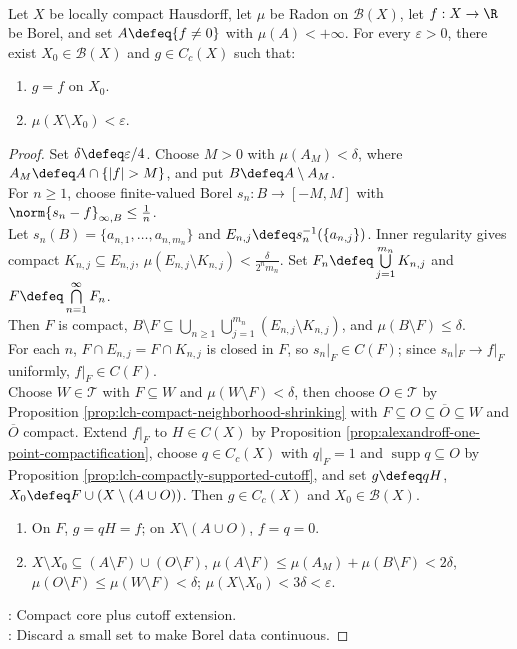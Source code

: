 \begin{theorem} \label{thm:lusin-radon-locally-compact} \\
Let $X$ be locally compact Hausdorff, let $\mu$ be Radon on $\mathcal{B}(X)$, let $f:X\to\R$ be Borel, and set $A\defeq\{f\neq0\}$ with $\mu(A)<+\infty$. For every $\varepsilon>0$, there exist $X_0\in\mathcal{B}(X)$ and $g\in C_c(X)$ such that:
\begin{enumerate}[label=(\roman*)]
\setlength{\itemsep}{0pt}
\item $g=f$ on $X_0$.
\item $\mu(X\setminus X_0)<\varepsilon$.
\end{enumerate}
\begin{proof} Set $\delta\defeq\varepsilon/4$. Choose $M>0$ with $\mu(A_M)<\delta$, where $A_M\defeq A\cap\{|f|>M\}$, and put $B\defeq A\setminus A_M$.\\
For $n\geq1$, choose finite-valued Borel $s_n:B\to[-M,M]$ with $\norm{s_n-f}_{\infty,B}\leq\frac{1}{n}$.\\
Let $s_n(B)=\{a_{n,1},\ldots,a_{n,m_n}\}$ and $E_{n,j}\defeq s_n^{-1}(\{a_{n,j}\})$. Inner regularity gives compact $K_{n,j}\subseteq E_{n,j}$, $\mu(E_{n,j}\setminus K_{n,j})<\frac{\delta}{2^n m_n}$. Set $F_n\defeq\bigcup\limits_{j=1}^{m_n}K_{n,j}$ and $F\defeq\bigcap\limits_{n=1}^{\infty}F_n$.\\
Then $F$ is compact, $B\setminus F\subseteq\bigcup\limits_{n\geq1}\bigcup\limits_{j=1}^{m_n}(E_{n,j}\setminus K_{n,j})$, and $\mu(B\setminus F)\leq\delta$.\\
For each $n$, $F\cap E_{n,j}=F\cap K_{n,j}$ is closed in $F$, so $s_n|_F\in C(F)$; since $s_n|_F\to f|_F$ uniformly, $f|_F\in C(F)$.\\
Choose $W\in\mathcal{T}$ with $F\subseteq W$ and $\mu(W\setminus F)<\delta$, then choose $O\in\mathcal{T}$ by Proposition \ref{prop:lch-compact-neighborhood-shrinking} with $F\subseteq O\subseteq\overline{O}\subseteq W$ and $\overline{O}$ compact. Extend $f|_F$ to $H\in C(X)$ by Proposition \ref{prop:alexandroff-one-point-compactification}, choose $q\in C_c(X)$ with $q|_F=1$ and $\operatorname{supp}q\subseteq O$ by Proposition \ref{prop:lch-compactly-supported-cutoff}, and set $g\defeq qH$, $X_0\defeq F\cup(X\setminus(A\cup O))$. Then $g\in C_c(X)$ and $X_0\in\mathcal{B}(X)$.
\begin{enumerate}[label=(\roman*)]
\setlength{\itemsep}{0pt}
\item[(i)] On $F$, $g=qH=f$; on $X\setminus(A\cup O)$, $f=q=0$.
\item[(ii)] $X\setminus X_0\subseteq(A\setminus F)\cup(O\setminus F)$, $\mu(A\setminus F)\leq\mu(A_M)+\mu(B\setminus F)<2\delta$, $\mu(O\setminus F)\leq\mu(W\setminus F)<\delta$; $\mu(X\setminus X_0)<3\delta<\varepsilon$.
\end{enumerate}
: Compact core plus cutoff extension.\\
: Discard a small set to make Borel data continuous.
\end{proof}
\end{theorem}
